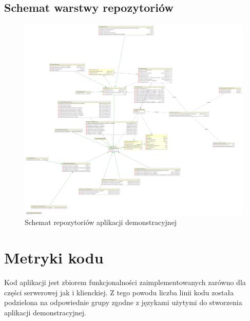 	\subsection{Schemat warstwy repozytoriów}
	\begin{figure}[H]
		\centering
		\includegraphics[width=\textwidth]{images/springatom_model_repository}
		\caption[Schemat repozytoriów aplikacji demonstracyjnej]{
			Schemat repozytoriów aplikacji demonstracyjnej
		}
		\label{app:schema_org_agatom_springatom_repository}
	\end{figure}
	
		
\section{Metryki kodu}
	Kod aplikacji jest zbiorem funkcjonalności zaimplementowanych zarówno dla części serwerowej jak i klienckiej. Z tego powodu liczba linii kodu
	została podzielona na odpowiednie grupy zgodne z językami użytymi do stworzenia aplikacji demonstracyjnej.
